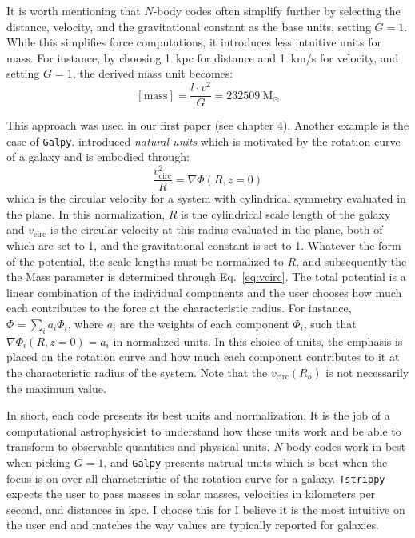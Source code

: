     It is worth mentioning that $N$-body codes often simplify further by selecting the distance, velocity, and the gravitational constant as the base units, setting $G=1$. While this simplifies force computations, it introduces less intuitive units for mass. For instance, by choosing 1~kpc for distance and 1~km/s for velocity, and setting $G=1$, the derived mass unit becomes: 
    \begin{equation}
        \left[\mathrm{mass}\right] = \frac{l \cdot v^2}{G} = 232509~\mathrm{M}_\odot
    \end{equation}

    This approach was used in our first paper (see chapter 4). Another example is the case of \texttt{Galpy}. \citet{2015ApJS..216...29B} introduced \textit{natural units} which is motivated by the rotation curve of a galaxy and is embodied through: 
    \begin{equation}
        \frac{v_\mathrm{circ}^2}{R} = \nabla  \Phi \left(R, z=0\right)
        \label{eq:vcirc}
    \end{equation}
    which is the circular velocity for a system with cylindrical symmetry evaluated in the plane. In this normalization, $R$ is the cylindrical scale length of the galaxy and $v_\mathrm{circ}$ is the circular velocity at this radius evaluated in the plane, both of which are set to 1, and the gravitational constant is set to 1. Whatever the form of the potential, the scale lengths must be normalized to $R$, and subsequently the the Mass parameter is determined through Eq.~\ref{eq:vcirc}. The total potential is a linear combination of the individual components and the user chooses how much each contributes to the force at the characteristic radius. For instance, $\Phi = \sum_i a_i\Phi_i$, where $a_i$ are the weights of each component $\Phi_i$, such that $\nabla \Phi_i(R,z=0) = a_i$ in normalized units. In this choice of units, the emphasis is placed on the rotation curve and how much each component contributes to it at the characteristic radius of the system. Note that the $v_\mathrm{circ}(R_o)$ is not necessarily the maximum value. 

    In short, each code presents its best units and normalization. It is the job of a computational astrophysicist to understand how these units work and be able to transform to observable quantities and physical units. $N$-body codes work in best when picking $G=1$, and \texttt{Galpy} presents natrual units which is best when the focus is on over all characteristic of the rotation curve for a galaxy. \texttt{Tstrippy} expects the user to pass masses in solar masses, velocities in kilometers per second, and distances in kpc. I choose this for I believe it is the most intuitive on the user end and matches the way values are typically reported for galaxies. 
    


